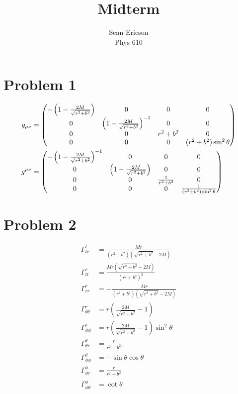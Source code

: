 \documentclass[12pt]{article}
\newcommand{\chrissym}[3]{\Gamma_{#2#3}^#1}
\begin{document}
\title{Midterm}
\author{Sean Ericson \\ Phys 610}
\maketitle

\section*{Problem 1}
\begin{align*}
    g_{\mu\nu} &= \mqty(-\left(1 - \frac{2M}{\sqrt{r^2 + b^2}}\right) & 0 & 0 & 0 \\ 0 & \left(1 - \frac{2M}{\sqrt{r^2 + b^2}}\right)^{-1} & 0 & 0 \\ 0 & 0 & r^2 + b^2 & 0 \\ 0 & 0 & 0 & (r^2 + b^2)\sin^2\theta) \\
    g^{\mu\nu} &= \mqty(-\left(1 - \frac{2M}{\sqrt{r^2 + b^2}}\right)^{-1} & 0 & 0 & 0 \\ 0 & \left(1 - \frac{2M}{\sqrt{r^2 + b^2}}\right) & 0 & 0 \\ 0 & 0 & \frac{1}{r^2 + b^2} & 0 \\ 0 & 0 & 0 & \frac{1}{(r^2 + b^2)\sin^2\theta}) \\
\end{align*}


\section*{Problem 2}
\begin{align*}
    \chrissym{t}{t}{r} &= \frac{Mr}{(r^2 + b^2)\left(\sqrt{r^2 + b^2} - 2M\right)} \\
    \chrissym{r}{t}{t} &= \frac{Mr\left(\sqrt{r^2 + b^2} - 2M\right)}{(r^2 + b^2)^2} \\
    \chrissym{r}{r}{r} &= -\frac{Mr}{(r^2 + b^2)\left(\sqrt{r^2 + b^2} - 2M\right)} \\
    \chrissym{r}{\theta}{\theta} &= r\left(\frac{2M}{\sqrt{r^2 + b^2}} - 1\right) \\
    \chrissym{r}{\phi}{\phi} &= r\left(\frac{2M}{\sqrt{r^2 + b^2}} - 1\right) \sin^2\theta \\
    \chrissym{\theta}{\theta}{r} &= \frac{r}{r^2 + b^2}  \\
    \chrissym{\theta}{\phi}{\phi} &= -\sin\theta\cos\theta \\
    \chrissym{\phi}{\phi}{r} &= \frac{r}{r^2 + b^2} \\
    \chrissym{\phi}{\phi}{\theta} &= \cot\theta
\end{align*}
\end{document}
